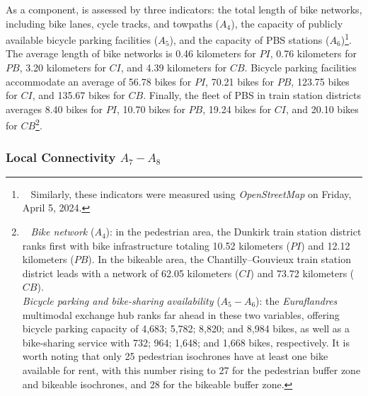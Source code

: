 \begin{refsegment}
As a component,  is assessed by three indicators: the total length of bike networks, including bike lanes, cycle tracks, and towpaths (\(A_{4}\)), the capacity of publicly available bicycle parking facilities (\(A_{5}\)), and the capacity of \acrshort{PBS} stations (\(A_{6}\))\footnote{~
    Similarly, these indicators were measured using \textsl{OpenStreetMap} on Friday, April 5, 2024.
}. The average length of bike networks is 0.46 kilometers for \(PI\), 0.76 kilometers for \(PB\), 3.20 kilometers for \(CI\), and 4.39 kilometers for \(CB\). Bicycle parking facilities accommodate an average of 56.78 bikes for \(PI\), 70.21 bikes for \(PB\), 123.75 bikes for \(CI\), and 135.67 bikes for \(CB\). Finally, the fleet of \acrshort{PBS} in train station districts averages 8.40 bikes for \(PI\), 10.70 bikes for \(PB\), 19.24 bikes for \(CI\), and 20.10 bikes for \(CB\)\footnote{~
    \textsl{Bike network} (\(A_{4}\)): in the pedestrian area, the Dunkirk train station district ranks first with bike infrastructure totaling 10.52 kilometers (\(PI\)) and 12.12 kilometers (\(PB\)). In the bikeable area, the Chantilly–Gouvieux train station district leads with a network of 62.05 kilometers (\(CI\)) and 73.72 kilometers (\(CB\)).
    \\
    \textsl{Bicycle parking and bike-sharing availability} (\(A_{5} - A_{6}\)): the \textsl{Euraflandres} multimodal exchange hub ranks far ahead in these two variables, offering bicycle parking capacity of 4,683; 5,782; 8,820; and 8,984 bikes, as well as a bike-sharing service with 732; 964; 1,648; and 1,668 bikes, respectively. It is worth noting that only 25 pedestrian isochrones have at least one bike available for rent, with this number rising to 27 for the pedestrian buffer zone and bikeable isochrones, and 28 for the bikeable buffer zone.
}.

\subsubsection*{Local Connectivity \(A_{7} - A_{8}\)
    \label{chap6:indicateurs-accessibility-connectivite}
    }


\end{refsegment}
